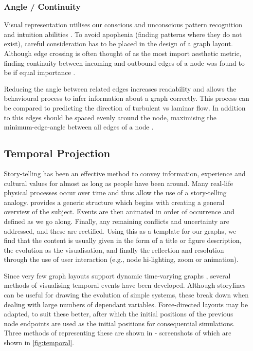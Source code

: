 \subsubsection{ Angle / Continuity}
Visual representation utilises our conscious and unconscious pattern recognition and intuition abilities \citep{pattern}. To avoid apophenia (finding patterns where they do not exist), careful consideration has to be placed in the design of a graph layout.
Although edge crossing is often thought of as the most import aesthetic metric, finding continuity between incoming and outbound edges of a node was found to be if equal importance \citep{continuity}.

Reducing the angle between related edges increases readability and allows the behavioural process to infer information about a graph correctly. This process can be compared to predicting the direction of turbulent vs laminar flow. In addition to this edges should be spaced evenly around the node, maximising the minimum-edge-angle between all edges of a node \citep{aestheticsgraphvis}.



\subsection{Temporal Projection}
Story-telling has been an effective method to convey information, experience and cultural values for almost as long as people have been around. Many real-life physical processes occur over time and thus allow the use of a story-telling analogy. \cite{storytelling} provides a generic structure which begins with creating a general overview of the subject. Events are then animated in order of occurrence and defined as we go along. Finally, any remaining conflicts and uncertainty are addressed, and these are rectified.
Using this as a template for our graphs, we find that the content is usually given in the form of a title or figure description, the evolution as the visualisation, and finally the reflection and resolution through the use of user interaction (e.g., node hi-lighting, zoom or animation).

Since very few graph layouts support dynamic time-varying graphs \citep{tvg}, several methods of visualising temporal events have been developed.
Although storylines can be useful for drawing the evolution of simple systems, these break down when dealing with large numbers of dependant variables. Force-directed layouts may be adapted, to suit these better, after which the initial positions of the previous node endpoints are used as the initial positions for consequential simulations. Three methods of representing these are shown in \citep{daygraph} - screenshots of which are shown in \autoref{fig:temporal}.



